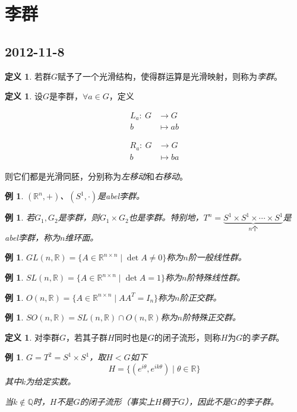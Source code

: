 \documentclass[winfonts,UTF8,c5size,a4paper,fancyhdr,hyperref,titlepage,nocap]{ctexart}
\newtheorem{exa}[thm]{例}
\theoremstyle{definition}
\newtheorem{defn}[thm]{定义}
\theoremstyle{remark}
\numberwithin{equation}{subsection}
\newcommand{\Q}{\mathbb{Q}}
\newcommand{\Real}{\mathbb{R}}
\newcommand{\red}{\color{red}}
\newcommand{\mapdes}[5]
  {
    \begin{align*}
      #1\colon\  #2 & \longrightarrow  #3 \\
            #4 & \mapsto  #5
    \end{align*}
  }
\begin{document}
\section{李群}
\subsection*{2012-11-8}
\begin{defn}
  若群$G$赋予了一个光滑结构，使得群运算是光滑映射，则称为\emph{\red 李群}。
\end{defn}
\begin{defn}
  设$G$是李群，$\forall a\in G$，定义
  \begin{center}
  \parbox{0.4\linewidth}{\mapdes{L_a}{G}{G}{b}{ab}}
  \parbox{0.4\linewidth}{\mapdes{R_a}{G}{G}{b}{ba}}
  \end{center}
则它们都是光滑同胚，分别称为\emph{\red 左移动}和\emph{\red 右移动}。
\end{defn}
\begin{exa}
  $(\Real^n,+)$、$(S^1,\cdot)$是abel李群。
\end{exa}
\begin{exa}
  若$G_1,G_2$是李群，则$G_1\times G_2$也是李群。特别地，$T^n=\underbrace{S^1\times S^1\times\cdots\times S^1}_{n\text{个}}$是abel李群，称为$n$维环面。
\end{exa}
\begin{exa}
  $GL(n,\Real)=\{A\in\Real^{n\times n}\mid\det A\neq0\}$称为$n$阶{\red 一般线性群}。
\end{exa}
\begin{exa}
  $SL(n,\Real)=\{A\in\Real^{n\times n}\mid\det A=1\}$称为$n$阶{\red 特殊线性群}。
\end{exa}
\begin{exa}
  $O(n,\Real)=\{A\in\Real^{n\times n}\mid AA^T=I_n\}$称为$n$阶{\red 正交群}。
\end{exa}
\begin{exa}
  $SO(n,\Real)=SL(n,\Real)\cap O(n,\Real)$称为$n$阶{\red 特殊正交群}。
\end{exa}

\begin{defn}
  对李群$G$，若其子群$H$同时也是$G$的闭子流形，则称$H$为$G$的\emph{\red 李子群}。
\end{defn}
\begin{exa}
  $G=T^2=S^1\times S^1$，取$H<G$如下
  \begin{equation*}
    H=\{(e^{i\theta},e^{ik\theta})\mid\theta\in\Real\}
  \end{equation*}
其中$k$为给定实数。

当$k\notin\Q$时，$H$不是$G$的闭子流形（事实上$H$稠于$G$），因此不是$G$的李子群。
\end{exa}
\end{document}
